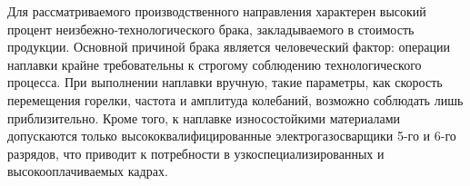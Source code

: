 Для рассматриваемого производственного направления характерен высокий процент неизбежно-технологического брака, закладываемого в стоимость продукции.
Основной причиной брака является человеческий фактор: операции наплавки крайне требовательны к строгому соблюдению технологического процесса.
При выполнении наплавки вручную, такие параметры, как скорость перемещения горелки, частота и амплитуда колебаний, возможно соблюдать лишь приблизительно.
Кроме того, к наплавке износостойкими материалами допускаются только высококвалифицированные электрогазосварщики 5-го и 6-го разрядов, что приводит к потребности в узкоспециализированных и высокооплачиваемых кадрах.

